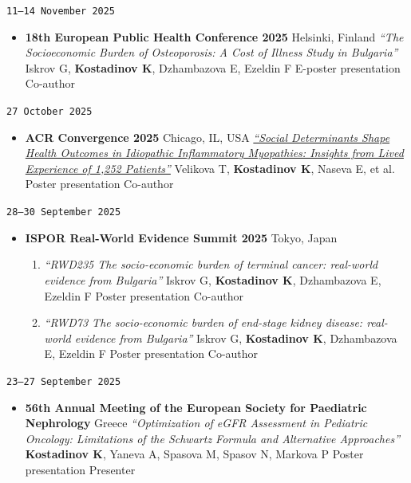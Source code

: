 \documentclass[
  10.5pt,
  a4paper,
  DIV=11,
  numbers=noendperiod]{scrartcl}
\providecommand{\tightlist}{%
  \setlength{\itemsep}{0pt}\setlength{\parskip}{0pt}}
\let\oldtexttt\texttt
\renewcommand{\texttt}[1]{{\color{cvbronze}\small\oldtexttt{#1}}}
\begin{document}
\texttt{11–14\ November\ 2025}

\begin{itemize}
\tightlist
\item
  \textbf{18th European Public Health Conference 2025} \textbar{}
  Helsinki, Finland \textbar{} \emph{``The Socioeconomic Burden of
  Osteoporosis: A Cost of Illness Study in Bulgaria''} \textbar{} Iskrov
  G, \textbf{Kostadinov K}, Dzhambazova E, Ezeldin F \textbar{} E-poster
  presentation \textbar{} Co-author
\end{itemize}

\texttt{27\ October\ 2025}

\begin{itemize}
\tightlist
\item
  \textbf{ACR Convergence 2025} \textbar{} Chicago, IL, USA \textbar{}
  \emph{\href{https://acrabstracts.org/abstract/social-determinants-shape-health-outcomes-in-idiopathic-inflammatory-myopathies-insights-from-lived-experience-of-1252-patients/}{``Social
  Determinants Shape Health Outcomes in Idiopathic Inflammatory
  Myopathies: Insights from Lived Experience of 1,252 Patients''}}
  \textbar{} Velikova T, \textbf{Kostadinov K}, Naseva E, et
  al.~\textbar{} Poster presentation \textbar{} Co-author
\end{itemize}

\texttt{28–30\ September\ 2025}

\begin{itemize}
\tightlist
\item
  \textbf{ISPOR Real-World Evidence Summit 2025} \textbar{} Tokyo, Japan

  \begin{enumerate}
  \def\labelenumi{\arabic{enumi}.}
  \tightlist
  \item
    \emph{``RWD235 The socio-economic burden of terminal cancer:
    real-world evidence from Bulgaria''} \textbar{} Iskrov G,
    \textbf{Kostadinov K}, Dzhambazova E, Ezeldin F \textbar{} Poster
    presentation \textbar{} Co-author
  \item
    \emph{``RWD73 The socio-economic burden of end-stage kidney disease:
    real-world evidence from Bulgaria''} \textbar{} Iskrov G,
    \textbf{Kostadinov K}, Dzhambazova E, Ezeldin F \textbar{} Poster
    presentation \textbar{} Co-author
  \end{enumerate}
\end{itemize}

\texttt{23–27\ September\ 2025}

\begin{itemize}
\tightlist
\item
  \textbf{56th Annual Meeting of the European Society for Paediatric
  Nephrology} \textbar{} Greece \textbar{} \emph{``Optimization of eGFR
  Assessment in Pediatric Oncology: Limitations of the Schwartz Formula
  and Alternative Approaches''} \textbar{} \textbf{Kostadinov K}, Yaneva
  A, Spasova M, Spasov N, Markova P \textbar{} Poster presentation
  \textbar{} Presenter
\end{itemize}
\end{document}
